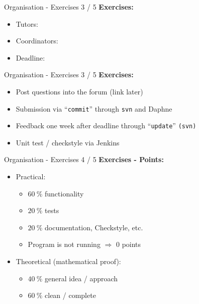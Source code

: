
\begin{frame}{Organisation - Exercises 3 / 5}
  \textbf{Exercises:}
  \begin{itemize}
    \item
      Tutors: \LectureOrganisationTutors
    \item<2- |handout:1>
      Coordinators: \LectureOrganisationAdditional
    \item<3- |handout:1>
      Deadline: \LectureOrganisationExercisesWorkingTime
  \end{itemize}
\end{frame}



\begin{frame}{Organisation - Exercises 3 / 5}
  \textbf{Exercises:}
  \begin{itemize}
    \item
      Post questions into the forum (link later)
    \item<2- |handout:1>
      Submission via \enquote{\texttt{commit}} through \texttt{svn} and Daphne
    \item<3- |handout:1>
      Feedback one week after deadline through \enquote{\texttt{update}}
      \texttt{(svn)}
    \item<4- |handout:1>
      Unit test / checkstyle via Jenkins
  \end{itemize}
\end{frame}


\begin{frame}{Organisation - Exercises 4 / 5}
  \textbf{Exercises - Points:}
  \begin{itemize}
    \item
      Practical:
      \begin{itemize}
        \item
          {\color{MainA}$\SI{60}{\percent}$} functionality
        \item
          {\color{MainA}$\SI{20}{\percent}$} tests 
        \item
          {\color{MainA}$\SI{20}{\percent}$} documentation, Checkstyle, etc.
        \item
          {\color{MainB}Program is not running}
          $\Rightarrow$
          {\color{MainB}0 points}
      \end{itemize}
    \item<2- |handout:1>
      Theoretical (mathematical proof):
      \begin{itemize}
        \item
          {\color{MainA}$\SI{40}{\percent}$} general idea / approach
        \item
          {\color{MainA}$\SI{60}{\percent}$} clean / complete
      \end{itemize}
  \end{itemize}
\end{frame}

